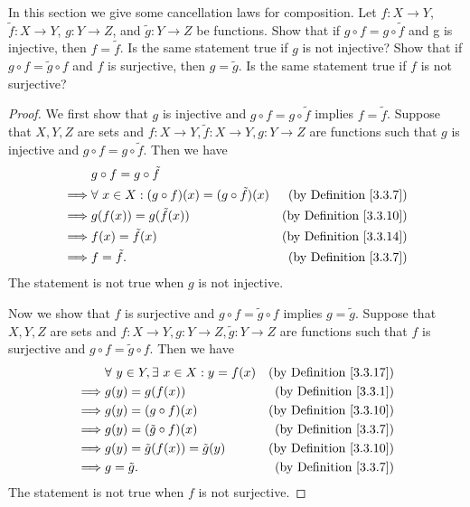 \begin{exercise}\label{ex 3.3.4}
In this section we give some cancellation laws for composition.
Let \(f : X \to Y\), \(\tilde{f} : X \to Y\), \(g : Y \to Z\), and \(\tilde{g} : Y \to Z\) be functions.
Show that if \(g \circ f = g \circ \tilde{f}\) and g is injective, then \(f = \tilde{f}\).
Is the same statement true if \(g\) is not injective?
Show that if \(g \circ f = \tilde{g} \circ f\) and \(f\) is surjective, then \(g = \tilde{g}\).
Is the same statement true if \(f\) is not surjective?
\end{exercise}

\begin{proof}
We first show that \(g\) is injective and \(g \circ f = g \circ \tilde{f}\) implies \(f = \tilde{f}\).
Suppose that \(X, Y, Z\) are sets and \(f : X \to Y, \tilde{f} : X \to Y, g : Y \to Z\) are functions such that \(g\) is injective and \(g \circ f = g \circ \tilde{f}\).
Then we have
\begin{align*}
& g \circ f = g \circ \tilde{f} \\
\implies & \forall\ x \in X : (g \circ f)(x) = (g \circ \tilde{f})(x) & \text{(by Definition \ref{3.3.7})} \\
\implies & g(f(x)) = g(\tilde{f}(x)) & \text{(by Definition \ref{3.3.10})} \\
\implies & f(x) = \tilde{f}(x) & \text{(by Definition \ref{3.3.14})} \\
\implies & f = \tilde{f}. & \text{(by Definition \ref{3.3.7})}
\end{align*}
The statement is not true when \(g\) is not injective.

Now we show that \(f\) is surjective and \(g \circ f = \tilde{g} \circ f\) implies \(g = \tilde{g}\).
Suppose that \(X, Y, Z\) are sets and \(f : X \to Y, g : Y \to Z, \tilde{g} : Y \to Z\) are functions such that \(f\) is surjective and \(g \circ f = \tilde{g} \circ f\).
Then we have
\begin{align*}
& \forall\ y \in Y, \exists\ x \in X : y = f(x) & \text{(by Definition \ref{3.3.17})} \\
\implies & g(y) = g(f(x)) & \text{(by Definition \ref{3.3.1})} \\
\implies & g(y) = (g \circ f)(x) & \text{(by Definition \ref{3.3.10})} \\
\implies & g(y) = (\tilde{g} \circ f)(x) & \text{(by Definition \ref{3.3.7})} \\
\implies & g(y) = \tilde{g}(f(x)) = \tilde{g}(y) & \text{(by Definition \ref{3.3.10})} \\
\implies & g = \tilde{g}. & \text{(by Definition \ref{3.3.7})}
\end{align*}
The statement is not true when \(f\) is not surjective.
\end{proof}

